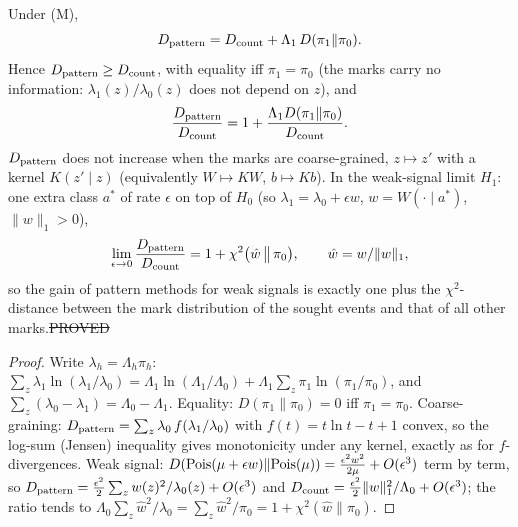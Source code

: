 \begin{theorem}\label{thm:pattern-gain}
Under (M),
\[
D_{\rm pattern}=D_{\rm count}+\Lambda_1\,D(\pi_1\|\pi_0).
\]
Hence $D_{\rm pattern}\ge D_{\rm count}$, with equality iff $\pi_1=\pi_0$ (the marks carry no information: $\lambda_1(z)/\lambda_0(z)$ does not depend on $z$), and
\[
\frac{D_{\rm pattern}}{D_{\rm count}}=1+\frac{\Lambda_1D(\pi_1\|\pi_0)}{D_{\rm count}}.
\]
$D_{\rm pattern}$ does not increase when the marks are coarse-grained, $z\mapsto z'$ with a kernel $K(z'\mid z)$ (equivalently $W\mapsto KW$, $b\mapsto Kb$).
In the weak-signal limit $H_1$: one extra class $a^\ast$ of rate $\epsilon$ on top of $H_0$ (so $\lambda_1=\lambda_0+\epsilon w$, $w=W(\cdot\mid a^\ast)$, $\|w\|_1>0$),
\[
\lim_{\epsilon\to0}\frac{D_{\rm pattern}}{D_{\rm count}}=1+\chi^2\big(\hat w\,\big\|\,\pi_0\big),\qquad\hat w=w/\|w\|_1,
\]
so the gain of pattern methods for weak signals is exactly one plus the $\chi^2$-distance between the mark distribution of the sought events and that of all other marks.\hfill\st{PROVED}
\end{theorem}
\begin{proof}
Write $\lambda_h=\Lambda_h\pi_h$: $\sum_z\lambda_1\ln(\lambda_1/\lambda_0)=\Lambda_1\ln(\Lambda_1/\Lambda_0)+\Lambda_1\sum_z\pi_1\ln(\pi_1/\pi_0)$, and $\sum_z(\lambda_0-\lambda_1)=\Lambda_0-\Lambda_1$. Equality: $D(\pi_1\|\pi_0)=0$ iff $\pi_1=\pi_0$.
Coarse-graining: $D_{\rm pattern}=\sum_z\lambda_0\,f(\lambda_1/\lambda_0)$ with $f(t)=t\ln t-t+1$ convex, so the log-sum (Jensen) inequality gives monotonicity under any kernel, exactly as for $f$-divergences.
Weak signal: $D({\rm Pois}(\mu+\epsilon w)\|{\rm Pois}(\mu))=\tfrac{\epsilon^2w^2}{2\mu}+O(\epsilon^3)$ term by term, so $D_{\rm pattern}=\tfrac{\epsilon^2}2\sum_zw(z)^2/\lambda_0(z)+O(\epsilon^3)$ and $D_{\rm count}=\tfrac{\epsilon^2}2\|w\|_1^2/\Lambda_0+O(\epsilon^3)$; the ratio tends to $\Lambda_0\sum_z\hat w^2/\lambda_0=\sum_z\hat w^2/\pi_0=1+\chi^2(\hat w\|\pi_0)$.
\end{proof}

